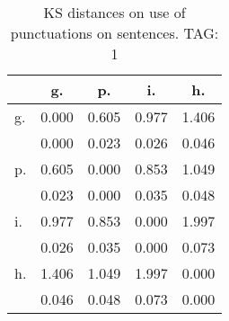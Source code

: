 \begin{table}[h!]
\begin{center}
\begin{tabular}{| l | c | c | c | c |}\hline
 & g. & p. & i. & h. \\\hline
g. & 0.000  & 0.605  & 0.977  & 1.406 \\\hline
 & 0.000  & 0.023  & 0.026  & 0.046 \\\hline
p. & 0.605  & 0.000  & 0.853  & 1.049 \\\hline
 & 0.023  & 0.000  & 0.035  & 0.048 \\\hline
i. & 0.977  & 0.853  & 0.000  & 1.997 \\\hline
 & 0.026  & 0.035  & 0.000  & 0.073 \\\hline
h. & 1.406  & 1.049  & 1.997  & 0.000 \\\hline
 & 0.046  & 0.048  & 0.073  & 0.000 \\\hline
\end{tabular}
\caption{KS distances on use of punctuations on sentences. TAG: 1}
\end{center}
\end{table}